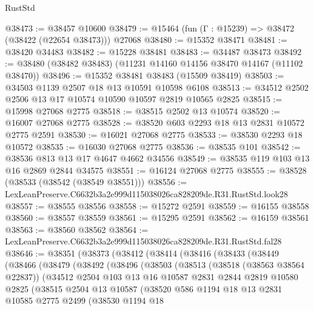 \begin{lexlean}{RustStd}
\begin{coremodule}
@38473 := @38457 @10600
@38479 := @15464 (fun (Γ : @15239) => @38472 (@38422 (@22654 @38473))) @27068
@38480 := @15352 @38471
@38481 := @38420 @34483
@38482 := @15228 @38481
@38483 := @34487 @38473
@38492 := @38480 (@38482 @38483) (@11231 @14160 @14156 @38470 @14167 (@11102 @38470))
@38496 := @15352 @38481 @38483 (@15509 @38419)
@38503 := @34503 @1139 @2507 @18 @13 @10591 @10598 @6108
@38513 := @34512 @2502 @2506 @13 @17 @10574 @10590 @10597 @2819 @10565 @2825
@38515 := @15998 @27068 @2775
@38518 := @38515 @2502 @13 @10574
@38520 := @16007 @27068 @2775
@38528 := @38520 @603 @2293 @18 @13 @2831 @10572 @2775 @2591
@38530 := @16021 @27068 @2775
@38533 := @38530 @2293 @18 @10572
@38535 := @16030 @27068 @2775
@38536 := @38535 @101
@38542 := @38536 @813 @13 @17 @4647 @4662 @34556
@38549 := @38535 @119 @103 @13 @16 @2869 @2844 @34575
@38551 := @16124 @27068 @2775
@38555 := @38528 (@38533 (@38542 (@38549 @38551)))
@38556 := LexLeanPreserve.C6632b3a2e999d115038026ca828209de.R31.RustStd.look28
@38557 := @38555 @38556
@38558 := @15272 @2591
@38559 := @16155 @38558
@38560 := @38557 @38559
@38561 := @15295 @2591
@38562 := @16159 @38561
@38563 := @38560 @38562
@38564 := LexLeanPreserve.C6632b3a2e999d115038026ca828209de.R31.RustStd.fal28
@38646 := @38351
    (@38373
      (@38412
        (@38414
          (@38416
            (@38433
              (@38449
                (@38466
                  (@38479
                    (@38492
                      (@38496
                        (@38503
                          (@38513
                            (@38518 (@38563 @38564 @22837))
                            (@34512
                              @2504
                              @103
                              @13
                              @16
                              @10587
                              @2831
                              @2844
                              @2819
                              @10580
                              @2825
                              (@38515
                                @2504
                                @13
                                @10587
                                (@38520
                                  @586
                                  @1194
                                  @18
                                  @13
                                  @2831
                                  @10585
                                  @2775
                                  @2499
                                  (@38530
                                    @1194
                                    @18

\end{coremodule}
\end{lexlean}
